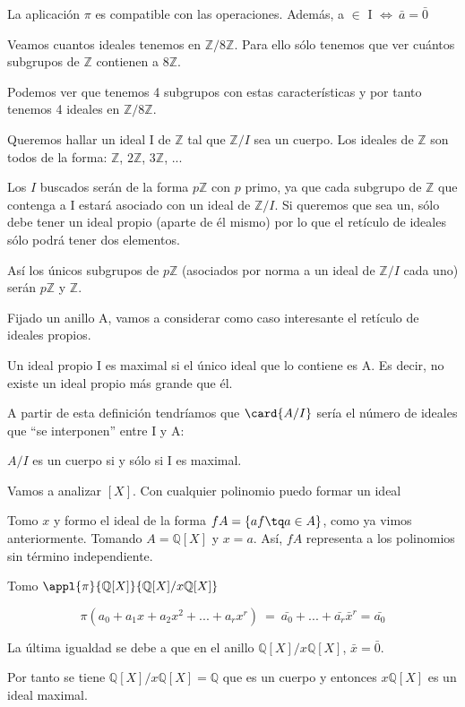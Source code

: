 \documentclass[nochap]{apuntes}
\begin{document}
\obs La aplicación $\pi$  es compatible con las operaciones. Además, a $\in$ I $\Leftrightarrow \ \bar{a}=\bar{0}$

\begin{example}
 Veamos cuantos ideales tenemos en $\mathbb{Z}/8\mathbb{Z}$.  Para ello sólo tenemos que ver cuántos subgrupos de $\mathbb{Z}$  contienen a $8\mathbb{Z}$. 
 
 Podemos ver que tenemos 4 subgrupos con estas características y por tanto tenemos 4 ideales en $\mathbb{Z}/8\mathbb{Z}$.
\end{example}

\begin{example}
 Queremos hallar un ideal I de $\mathbb{Z}$ tal que $\mathbb{Z}/I$  sea un cuerpo.  Los ideales de $\mathbb{Z}$ son todos de la forma: $\mathbb{Z}$, $2\mathbb{Z}$, $3\mathbb{Z}$, ... 
 
 Los $I$ buscados serán de la forma $p\mathbb{Z}$  con $p$ primo, ya que cada subgrupo de $\mathbb{Z}$ que contenga a I estará asociado con un ideal de $\mathbb{Z}/I$. Si queremos que sea un, sólo debe tener un ideal propio (aparte de él mismo) por lo que el retículo de ideales sólo podrá tener dos elementos.
 
 Así los únicos subgrupos de $p\mathbb{Z}$  (asociados por norma a un ideal de $\mathbb{Z}/I$  cada uno) serán $p\mathbb{Z}$  y $\mathbb{Z}$. 
\end{example}

Fijado un anillo A, vamos a considerar como caso interesante el retículo de ideales propios.
\begin{defn}
 Un ideal propio I es maximal si el único ideal que lo contiene es A. Es decir, no existe un ideal propio más grande que él.\\
\end{defn}

A partir de esta definición tendríamos que  $\card{A/I}$ sería el número de ideales que ``se interponen''  entre I y A:

\begin{lemma}
$A/I$ es un cuerpo si y sólo si I es maximal.
\end{lemma}

\begin{example}
 Vamos a analizar $[X]$. Con cualquier polinomio puedo formar un ideal
 
 Tomo $x$ y formo el ideal de la forma $fA=\{af \tq a\in A\}$, como ya vimos anteriormente. Tomando $A=\mathbb{Q}[X]$ y $x=a$. Así, $fA$ representa a los polinomios sin término independiente.
 
 Tomo $\appl{\pi}{\mathbb{Q}[X]}{\mathbb{Q}[X]/x\mathbb{Q}[X]}$
 
 \[\pi(a_0+a_1x+a_2x^{2}+...+a_rx^{r}) \ = \ \bar{a_0}+...+\bar{a_r}\bar{x}^{r} = \bar{a_0}\]
 
 La última igualdad se debe a que en el anillo $\mathbb{Q}[X]/x\mathbb{Q}[X]$, $\bar{x}=\bar{0}$. 
 
 Por tanto se tiene $\mathbb{Q}[X]/x\mathbb{Q}[X]=\mathbb{Q}$  que es un cuerpo y entonces $x\mathbb{Q}[X]$  es un ideal maximal.
\end{example}
\end{document}
